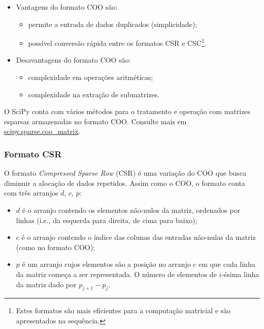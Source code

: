 \begin{itemize}
\item Vantagens do formato COO são:
  \begin{itemize}
  \item permite a entrada de dados duplicados (simplicidade);
  \item possível conversão rápida entre os formatos CSR e CSC\footnote{Estes formatos são mais eficientes para a computação matricial e são apresentados na sequência.}.
  \end{itemize}
  
\item Desavantagens do formato COO são:
  \begin{itemize}
  \item complexidade em operações aritméticas;
  \item complexidade na extração de submatrizes.
  \end{itemize}
\end{itemize}

\begin{obs}
  O SciPy conta com vários métodos para o tratamento e operação com matrizes esparsas armazenadas no formato COO. Consulte mais em \href{https://docs.scipy.org/doc/scipy/reference/generated/scipy.sparse.coo_matrix.html}{scipy.sparse.coo\_matrix}.
\end{obs}

\subsubsection{Formato CSR}

O formato {\it Compressed Sparse Row} (CSR) é uma variação do COO que busca diminuir a alocação de dados repetidos. Assim como o COO, o formato conta com três arranjos $d$, $c$, $p$:
\begin{itemize}
\item $d$ é o arranjo contendo os elementos não-nulos da matriz, ordenados por linhas (i.e., da esquerda para direita, de cima para baixo);
\item $c$ é o arranjo contendo o índice das colunas das entradas não-nulas da matriz (como no formato COO);
\item $p$ é um arranjo cujos elementos são a posição no arranjo $c$ em que cada linha da matriz começa a ser representada. O número de elementos de $i$-ésima linha da matriz dado por $p_{j+1}-p_j$.
\end{itemize}

